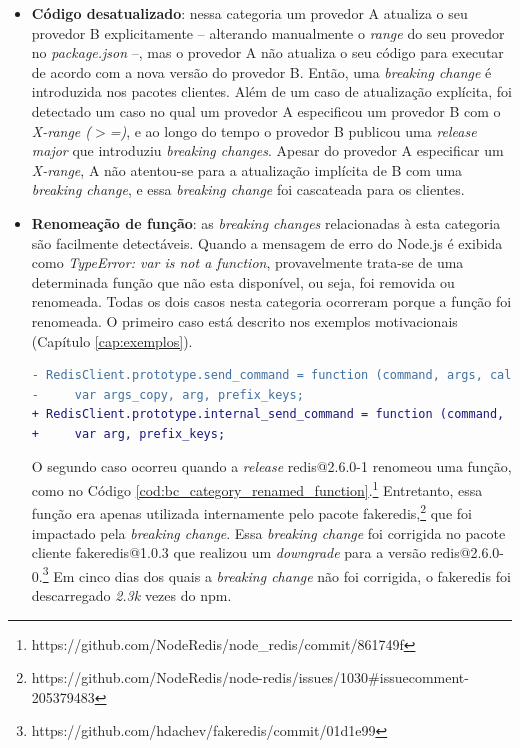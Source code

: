 \begin{itemize}
    \item \textbf{Código desatualizado}: nessa categoria um provedor \textsf{A} atualiza o seu provedor \textsf{B} explicitamente -- alterando manualmente o \textit{range} do seu provedor no \textit{package.json} --, mas o provedor \textsf{A} não atualiza o seu código para executar de acordo com a nova versão do provedor \textsf{B}. Então, uma \textit{breaking change} é introduzida nos pacotes clientes. Além de um caso de atualização explícita, foi detectado um caso no qual um provedor \textsf{A} especificou um provedor \textsf{B} com o \textit{X-range ($>$=)}, e ao longo do tempo o provedor \textsf{B} publicou uma \textit{release major} que introduziu \textit{breaking changes}. Apesar do provedor \textsf{A} especificar um \textit{X-range}, \textsf{A} não atentou-se para a atualização implícita de \textsf{B} com uma \textit{breaking change}, e essa \textit{breaking change} foi cascateada para os clientes.

    \item \textbf{Renomeação de função}: as \textit{breaking changes} relacionadas à esta categoria são facilmente detectáveis. Quando a mensagem de erro do \textsf{Node.js} é exibida como \textit{TypeError: var is not a function}, provavelmente trata-se de uma determinada função que não esta disponível, ou seja, foi removida ou renomeada. Todas os dois casos nesta categoria ocorreram porque a função foi renomeada. O primeiro caso está descrito nos exemplos motivacionais (Capítulo \ref{cap:exemplos}).

	 \begin{lstlisting}[numbers=none, language=diff, label=cod:bc_category_renamed_function, caption={Exemplo da categoria \textit{Renomeação de função}}]
- RedisClient.prototype.send_command = function (command, args, callback) {
-     var args_copy, arg, prefix_keys;
+ RedisClient.prototype.internal_send_command = function (command, args, callback) {
+     var arg, prefix_keys;
	 \end{lstlisting}

    O segundo caso ocorreu quando a \textit{release} \textsf{redis@2.6.0-1} renomeou uma função, como no Código \ref{cod:bc_category_renamed_function}.\footnote{https://github.com/NodeRedis/node\_redis/commit/861749f} Entretanto, essa função era apenas utilizada internamente pelo pacote \textsf{fakeredis},\footnote{https://github.com/NodeRedis/node-redis/issues/1030\#issuecomment-205379483} que foi impactado pela \textit{breaking change}. Essa \textit{breaking change} foi corrigida no pacote cliente \textsf{fakeredis@1.0.3} que realizou um \textit{downgrade} para a versão \textsf{redis@2.6.0-0}.\footnote{https://github.com/hdachev/fakeredis/commit/01d1e99} Em cinco dias dos quais a \textit{breaking change} não foi corrigida, o \textsf{fakeredis} foi descarregado \textit{2.3k} vezes do \textsf{npm}.


\end{itemize}
